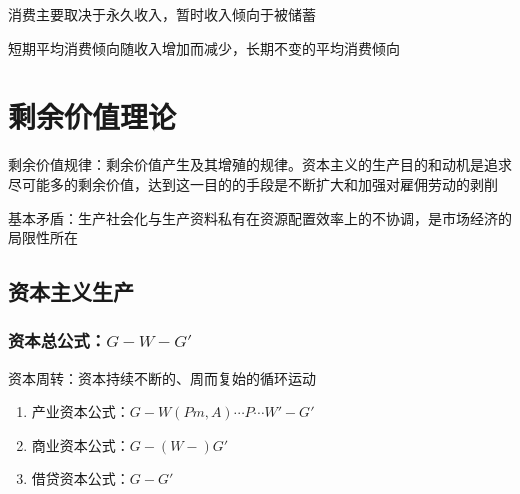 \documentclass[12pt]{book}
\begin{document}
\par 消费主要取决于永久收入，暂时收入倾向于被储蓄
\par 短期平均消费倾向随收入增加而减少，长期不变的平均消费倾向









\chapter{剩余价值理论}




剩余价值规律：剩余价值产生及其增殖的规律。资本主义的生产目的和动机是追求尽可能多的剩余价值，达到这一目的的手段是不断扩大和加强对雇佣劳动的剥削

基本矛盾：生产社会化与生产资料私有在资源配置效率上的不协调，是市场经济的局限性所在




\section{资本主义生产}






\subsection{资本总公式：$G-W-G'$}

\par 资本周转：资本持续不断的、周而复始的循环运动
\begin{enumerate}[(1)]
    \item 产业资本公式：$G-W(Pm,A)\cdots P\cdots W′-G′$
    \item 商业资本公式：$G-(W-)G'$
    \item 借贷资本公式：$G-G'$
\end{enumerate}
\end{document}
